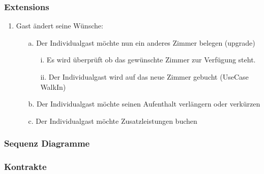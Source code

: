 \documentclass[./detailed_overview_usecases.tex]{subfiles}
\begin{document}
    \subsubsection*{Extensions}
    \begin{enumerate}
        \item Gast ändert seine Wünsche:
        \begin{itemize}
            \item[a.] Der Individualgast möchte nun ein anderes Zimmer belegen (upgrade)
            \begin{itemize}
                \item[i.] Es wird überprüft ob das gewünschte Zimmer zur Verfügung steht.
                \item[ii.] Der Individualgast wird auf das neue Zimmer gebucht (UseCase WalkIn)
            \end{itemize}
            \item[b.] Der Individualgast möchte seinen Aufenthalt verlängern oder verkürzen
            \item[c.] Der Individualgast möchte Zusatzleistungen buchen
        \end{itemize}
    \end{enumerate}

    \subsubsection{Sequenz Diagramme}
    \subsubsection{Kontrakte}
\end{document}
